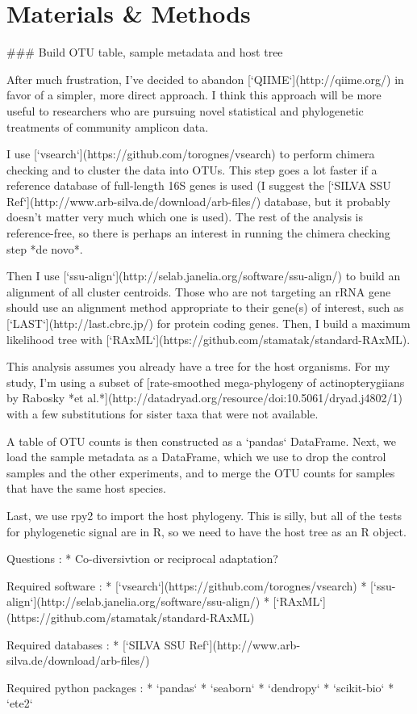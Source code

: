 \section{Materials \& Methods}

### Build OTU table, sample metadata and host tree

After much frustration, I've decided to abandon [`QIIME`](http://qiime.org/)
in favor of a simpler, more direct approach. I think this approach will be 
more useful to researchers who are pursuing novel statistical and phylogenetic
treatments of community amplicon data. 

I use [`vsearch`](https://github.com/torognes/vsearch) to perform chimera
checking and to cluster the data into OTUs. This step goes a lot faster if
a reference database of full-length 16S genes is used (I suggest the 
[`SILVA SSU Ref`](http://www.arb-silva.de/download/arb-files/) database, 
but it probably doesn't matter very much which one is used). The rest of 
the analysis is reference-free, so there is perhaps an interest in running
the chimera checking step *de novo*.

Then I use [`ssu-align`](http://selab.janelia.org/software/ssu-align/) to build an
alignment of all cluster centroids. Those who are not targeting an rRNA gene
should use an alignment method appropriate to their gene(s) of interest, 
such as [`LAST`](http://last.cbrc.jp/) for protein coding genes. Then, I build
a maximum likelihood tree with [`RAxML`](https://github.com/stamatak/standard-RAxML).

This analysis assumes you already have a tree for the host organisms. For my
study, I'm using a subset of  [rate-smoothed mega-phylogeny of actinopterygiians by
Rabosky *et al.*](http://datadryad.org/resource/doi:10.5061/dryad.j4802/1)
with a few substitutions for sister taxa that were not available.

A table of OTU counts is then constructed as a `pandas` DataFrame. Next, we load the
sample metadata as a DataFrame, which we use to drop the control samples and the other
experiments, and to merge the OTU counts for samples that have the same host species.

Last, we use rpy2 to import the host phylogeny. This is silly, but all of the tests 
for phylogenetic signal are in R, so we need to have the host tree as an R object.

Questions :
* Co-diversivtion or reciprocal adaptation?

Required software :
* [`vsearch`](https://github.com/torognes/vsearch)
* [`ssu-align`](http://selab.janelia.org/software/ssu-align/)
* [`RAxML`](https://github.com/stamatak/standard-RAxML)

Required databases :
* [`SILVA SSU Ref`](http://www.arb-silva.de/download/arb-files/)

Required python packages :
* `pandas`
* `seaborn`
* `dendropy`
* `scikit-bio`
* `ete2`